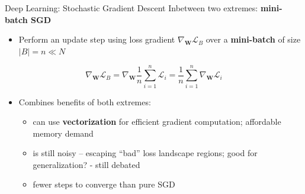 \begin{frame}{Deep Learning: Stochastic Gradient Descent}
\protect\hypertarget{deep-learning-stochastic-gradient-descent-1}{}
Inbetween two extremes: \textbf{mini-batch SGD}

\begin{itemize}
\tightlist
\item
  Perform an update step using loss gradient
  \(\nabla_\mathbf{W} \mathcal{L}_B\) over a \textbf{mini-batch} of size
  \(\vert B \vert = n \ll N\)
\end{itemize}

\[ \nabla_\mathbf{W} \mathcal{L}_B = \nabla_\mathbf{W} \dfrac{1}{n} {\displaystyle \sum_{i=1}^{n} \mathcal{L}_i} = \dfrac{1}{n} {\displaystyle \sum_{i=1}^{n} \nabla_\mathbf{W} \mathcal{L}_i} \]

\begin{itemize}
\tightlist
\item
  Combines benefits of both extremes:

  \begin{itemize}
  \tightlist
  \item
    can use \textbf{vectorization} for efficient gradient computation;
    affordable memory demand
  \item
    is still noisy -- escaping ``bad'' loss landscape regions; good for
    generalization? - still debated
  \item
    fewer steps to converge than pure SGD
  \end{itemize}
\end{itemize}

\end{frame}

